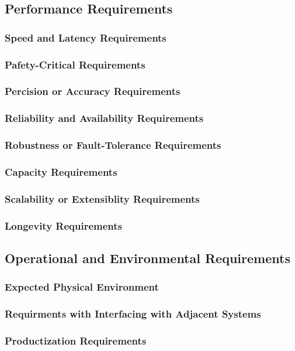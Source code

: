 \documentclass{article}
\begin{document}
\subsection{Performance Requirements}
\subsubsection{Speed and Latency Requirements}
\subsubsection{Pafety-Critical Requirements}
\subsubsection{Percision or Accuracy Requirements}
\subsubsection{Reliability and Availability Requirements}
\subsubsection{Robustness or Fault-Tolerance Requirements}
\subsubsection{Capacity Requirements}
\subsubsection{Scalability or Extensiblity Requirements}
\subsubsection{Longevity Requirements}

\subsection{Operational and Environmental Requirements}
\subsubsection{Expected Physical Environment}
\subsubsection{Requirments with Interfacing with Adjacent Systems}
\subsubsection{Productization Requirements}
\end{document}
